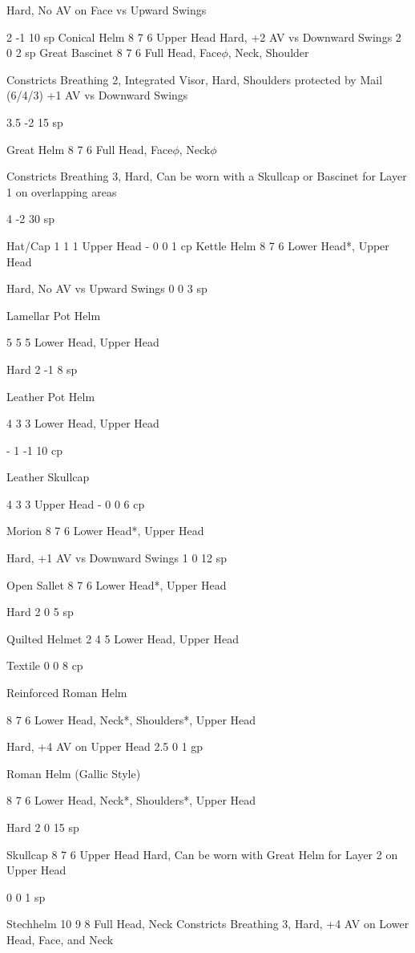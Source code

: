 \documentclass[oneside,11pt,english]{book}
\begin{document}
Hard, No AV on Face vs Upward 
Swings 

2 -1 10 
sp 
Conical Helm 8 7 6 Upper Head Hard, +2 AV vs Downward Swings 2 0 2 sp 
Great Bascinet 8 7 6 Full Head, Face$\phi$, 
Neck, Shoulder 

Constricts Breathing 2, Integrated 
Visor, Hard, Shoulders protected by 
Mail (6/4/3) +1 AV vs Downward 
Swings 

3.5 -2 15 
sp 

Great Helm 8 7 6 Full Head, Face$\phi$, 
Neck$\phi$ 

Constricts Breathing 3, Hard, Can be 
worn with a Skullcap or Bascinet for 
Layer 1 on overlapping areas 

4 -2 30 
sp 

Hat/Cap 1 1 1 Upper Head - 0 0 1 cp 
Kettle Helm 8 7 6 Lower Head*, Upper 
Head 

Hard, No AV vs Upward Swings 0 0 3 sp 

Lamellar Pot 
Helm 

5 5 5 Lower Head, Upper 
Head 

Hard 2 -1 8 sp 


Leather Pot 
Helm 

4 3 3 Lower Head, Upper 
Head 

- 1 -1 10 
cp 

Leather 
Skullcap 

4 3 3 Upper Head - 0 0 6 cp 

Morion 8 7 6 Lower Head*, Upper 
Head 

Hard, +1 AV vs Downward Swings 1 0 12 
sp 

Open Sallet 8 7 6 Lower Head*, Upper 
Head 

Hard 2 0 5 sp 

Quilted Helmet 2 4 5 Lower Head, Upper 
Head 

Textile 0 0 8 cp 

Reinforced 
Roman Helm 

8 7 6 Lower Head, Neck*, 
Shoulders*, Upper 
Head 

Hard, +4 AV on Upper Head 2.5 0 1 gp 

Roman Helm 
(Gallic Style) 

8 7 6 Lower Head, Neck*, 
Shoulders*, Upper 
Head 

Hard 2 0 15 
sp 

Skullcap 8 7 6 Upper Head Hard, Can be worn with Great Helm 
for Layer 2 on Upper Head 

0 0 1 sp 

Stechhelm 10 9 8 Full Head, Neck Constricts Breathing 3, Hard, +4 AV 
on Lower Head, Face, and Neck 
\end{document}

